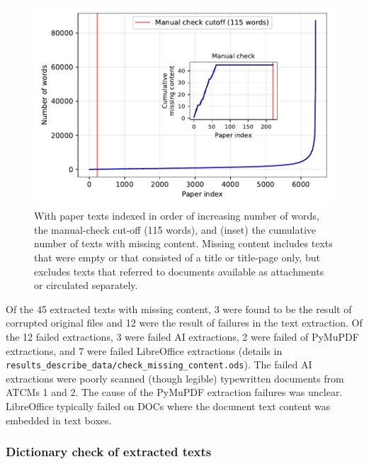 \documentclass[12pt]{article}
\begin{document}
\begin{figure}[h]
    \begin{minipage}[b]{0.40\textwidth}
        \caption{
            With paper texts indexed in order of increasing number of words,
            the manual-check cut-off (115 words),
            and (inset) the cumulative number of texts with missing content.
            Missing content includes texts that were empty
            or that consisted of a title or title-page only,
            but excludes texts that referred to documents 
            available as attachments or circulated separately.
        } \label{missing_content}
    \end{minipage}
    \hfill
    \begin{minipage}[b]{0.55\textwidth}
        \includegraphics[width=\textwidth]{../results_describe_data/missing_content.pdf}
    \end{minipage}
\end{figure}

Of the 45 extracted texts with missing content,
3 were found to be the result of corrupted original files
and 12 were the result of failures in the text extraction.
Of the 12 failed extractions,
3 were failed AI extractions,
2 were failed of PyMuPDF extractions,
and 7 were failed LibreOffice extractions
(details in {\tt results\_describe\_data/check\_missing\_content.ods}).
The failed AI extractions were
poorly scanned (though legible) typewritten documents from ATCMs 1 and 2.
The cause of the PyMuPDF extraction failures was unclear.
LibreOffice typically failed on DOCs where 
the document text content was embedded in text boxes.

\subsubsection{Dictionary check of extracted texts}
\end{document}
